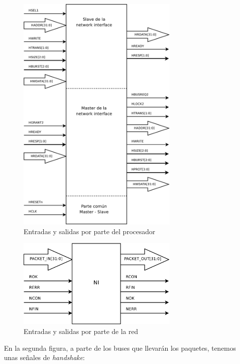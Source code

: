 \documentclass[a4paper, 12pt, babel, spanish]{article}
\begin{document}
\begin{figure}[h]
\centering
\includegraphics[width=0.7\textwidth]{fig/schem/top_ni}
\caption{Entradas y salidas por parte del procesador}
\end{figure}

\newpage

\begin{figure}[h]
\centering
\includegraphics[width=0.7\textwidth]{fig/schem/top_ni_net}
\caption{Entradas y salidas por parte de la red}
\end{figure}

En la segunda figura, a parte de los buses que llevarán los paquetes, tenemos unas señales de \emph{handshake}:
\end{document}
